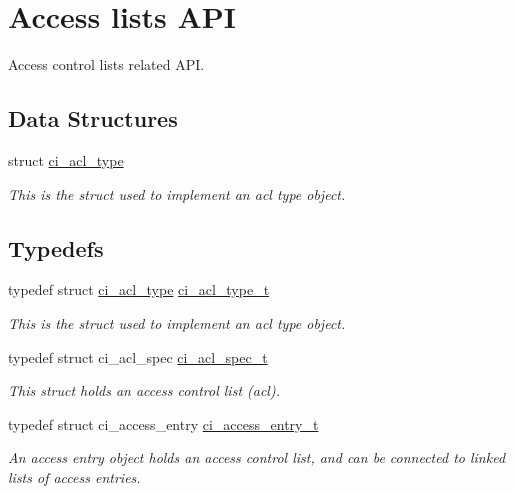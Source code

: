 \hypertarget{group__ACL}{
\section{Access lists API}
\label{group__ACL}
}


Access control lists related API.  
\subsection*{Data Structures}
\begin{DoxyCompactItemize}
\item 
struct \hyperlink{structci__acl__type}{ci\_\-acl\_\-type}
\begin{DoxyCompactList}\small\item\em This is the struct used to implement an acl type object. \item\end{DoxyCompactList}\end{DoxyCompactItemize}
\subsection*{Typedefs}
\begin{DoxyCompactItemize}
\item 
\hypertarget{group__ACL_ga97ecc1266c385bfb873e93992845a592}{
typedef struct \hyperlink{structci__acl__type}{ci\_\-acl\_\-type} \hyperlink{group__ACL_ga97ecc1266c385bfb873e93992845a592}{ci\_\-acl\_\-type\_\-t}}
\label{group__ACL_ga97ecc1266c385bfb873e93992845a592}

\begin{DoxyCompactList}\small\item\em This is the struct used to implement an acl type object. \item\end{DoxyCompactList}\item 
typedef struct ci\_\-acl\_\-spec \hyperlink{group__ACL_ga2f65107a03de82fff4ae2e1340195a7f}{ci\_\-acl\_\-spec\_\-t}
\begin{DoxyCompactList}\small\item\em This struct holds an access control list (acl). \item\end{DoxyCompactList}\item 
typedef struct ci\_\-access\_\-entry \hyperlink{group__ACL_ga569aa156e347e7912a7bf8610c1f6ca3}{ci\_\-access\_\-entry\_\-t}
\begin{DoxyCompactList}\small\item\em An access entry object holds an access control list, and can be connected to linked lists of access entries. \item\end{DoxyCompactList}\end{DoxyCompactItemize}
